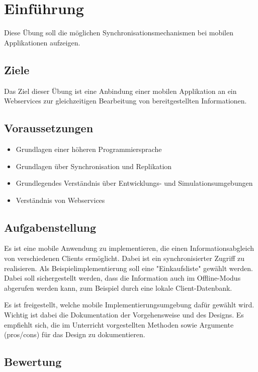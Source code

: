 
\section{Einführung}
Diese Übung soll die möglichen Synchronisationsmechanismen bei mobilen Applikationen aufzeigen.

\subsection{Ziele}
Das Ziel dieser Übung ist eine Anbindung einer mobilen Applikation an ein Webservices zur gleichzeitigen Bearbeitung von bereitgestellten Informationen.

\subsection{Voraussetzungen}
\begin{itemize}
\item Grundlagen einer höheren Programmiersprache
\item Grundlagen über Synchronisation und Replikation
\item Grundlegendes Verständnis über Entwicklungs- und Simulationsumgebungen
\item Verständnis von Webservices
\end{itemize}

\subsection{Aufgabenstellung}
Es ist eine mobile Anwendung zu implementieren, die einen Informationsabgleich von verschiedenen Clients ermöglicht. Dabei ist ein synchronisierter Zugriff zu realisieren. Als Beispielimplementierung soll eine "Einkaufsliste" gewählt werden. Dabei soll sichergestellt werden, dass die Information auch im Offline-Modus abgerufen werden kann, zum Beispiel durch eine lokale Client-Datenbank.

Es ist freigestellt, welche mobile Implementierungsumgebung dafür gewählt wird. Wichtig ist dabei die Dokumentation der Vorgehensweise und des Designs. Es empfiehlt sich, die im Unterricht vorgestellten Methoden sowie Argumente (pros/cons) für das Design zu dokumentieren.

\subsection{Bewertung}

